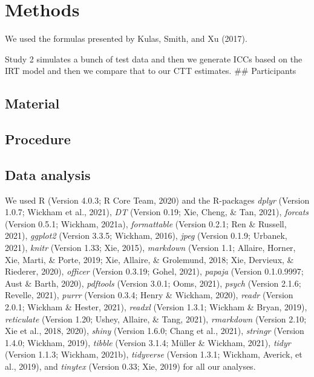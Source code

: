 \documentclass[
  english,
  man]{apa6}
\begin{document}
\hypertarget{methods}{%
\section{Methods}\label{methods}}

We used the formulas presented by Kulas, Smith, and Xu (2017).

Study 2 simulates a bunch of test data and then we generate ICCs based on the IRT model and then we compare that to our CTT estimates.
\#\# Participants

\hypertarget{material}{%
\subsection{Material}\label{material}}

\hypertarget{procedure}{%
\subsection{Procedure}\label{procedure}}

\hypertarget{data-analysis}{%
\subsection{Data analysis}\label{data-analysis}}

We used R (Version 4.0.3; R Core Team, 2020) and the R-packages \emph{dplyr} (Version 1.0.7; Wickham et al., 2021), \emph{DT} (Version 0.19; Xie, Cheng, \& Tan, 2021), \emph{forcats} (Version 0.5.1; Wickham, 2021a), \emph{formattable} (Version 0.2.1; Ren \& Russell, 2021), \emph{ggplot2} (Version 3.3.5; Wickham, 2016), \emph{jpeg} (Version 0.1.9; Urbanek, 2021), \emph{knitr} (Version 1.33; Xie, 2015), \emph{markdown} (Version 1.1; Allaire, Horner, Xie, Marti, \& Porte, 2019; Xie, Allaire, \& Grolemund, 2018; Xie, Dervieux, \& Riederer, 2020), \emph{officer} (Version 0.3.19; Gohel, 2021), \emph{papaja} (Version 0.1.0.9997; Aust \& Barth, 2020), \emph{pdftools} (Version 3.0.1; Ooms, 2021), \emph{psych} (Version 2.1.6; Revelle, 2021), \emph{purrr} (Version 0.3.4; Henry \& Wickham, 2020), \emph{readr} (Version 2.0.1; Wickham \& Hester, 2021), \emph{readxl} (Version 1.3.1; Wickham \& Bryan, 2019), \emph{reticulate} (Version 1.20; Ushey, Allaire, \& Tang, 2021), \emph{rmarkdown} (Version 2.10; Xie et al., 2018, 2020), \emph{shiny} (Version 1.6.0; Chang et al., 2021), \emph{stringr} (Version 1.4.0; Wickham, 2019), \emph{tibble} (Version 3.1.4; Müller \& Wickham, 2021), \emph{tidyr} (Version 1.1.3; Wickham, 2021b), \emph{tidyverse} (Version 1.3.1; Wickham, Averick, et al., 2019), and \emph{tinytex} (Version 0.33; Xie, 2019) for all our analyses.
\end{document}
